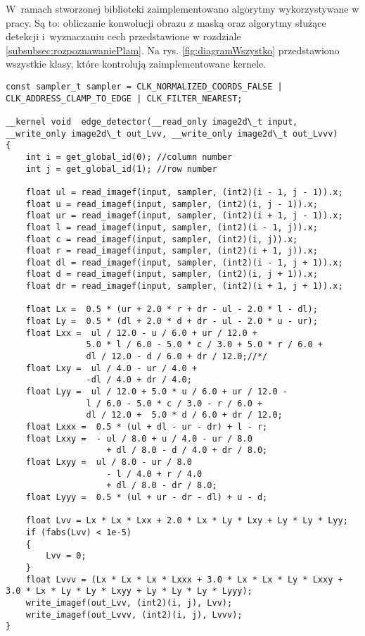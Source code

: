W~ramach stworzonej biblioteki zaimplementowano algorytmy wykorzystywane w pracy. Są to: obliczanie konwolucji obrazu z maską oraz algorytmy służące detekcji i~wyznaczaniu cech przedstawione w rozdziale \ref{subsubsec:rozpoznawaniePlam}. Na rys. \ref{fig:diagramWszystko} przedstawiono wszystkie klasy, które kontrolują zaimplementowane kernele.

\begin{lstlisting}
const sampler_t sampler = CLK_NORMALIZED_COORDS_FALSE | CLK_ADDRESS_CLAMP_TO_EDGE | CLK_FILTER_NEAREST;

__kernel void  edge_detector(__read_only image2d\_t input, __write_only image2d\_t out_Lvv, __write_only image2d\_t out_Lvvv)
{
	int i = get_global_id(0); //column number
	int j = get_global_id(1); //row number

	float ul = read_imagef(input, sampler, (int2)(i - 1, j - 1)).x;
	float u = read_imagef(input, sampler, (int2)(i, j - 1)).x;
	float ur = read_imagef(input, sampler, (int2)(i + 1, j - 1)).x;
	float l = read_imagef(input, sampler, (int2)(i - 1, j)).x;
	float c = read_imagef(input, sampler, (int2)(i, j)).x;
	float r = read_imagef(input, sampler, (int2)(i + 1, j)).x;
	float dl = read_imagef(input, sampler, (int2)(i - 1, j + 1)).x;
	float d = read_imagef(input, sampler, (int2)(i, j + 1)).x;
	float dr = read_imagef(input, sampler, (int2)(i + 1, j + 1)).x;

	float Lx =  0.5 * (ur + 2.0 * r + dr - ul - 2.0 * l - dl);
	float Ly =  0.5 * (dl + 2.0 * d + dr - ul - 2.0 * u - ur);
	float Lxx =  ul / 12.0 - u / 6.0 + ur / 12.0 +
                5.0 * l / 6.0 - 5.0 * c / 3.0 + 5.0 * r / 6.0 +
				dl / 12.0 - d / 6.0 + dr / 12.0;//*/
	float Lxy =  ul / 4.0 - ur / 4.0 +
				-dl / 4.0 + dr / 4.0;
	float Lyy =  ul / 12.0 + 5.0 * u / 6.0 + ur / 12.0 -
                l / 6.0 - 5.0 * c / 3.0 - r / 6.0 +
				dl / 12.0 +  5.0 * d / 6.0 + dr / 12.0;
	float Lxxx =  0.5 * (ul + dl - ur - dr) + l - r;
	float Lxxy =  - ul / 8.0 + u / 4.0 - ur / 8.0
					+ dl / 8.0 - d / 4.0 + dr / 8.0;
	float Lxyy =  ul / 8.0 - ur / 8.0
					- l / 4.0 + r / 4.0
					+ dl / 8.0 - dr / 8.0;
	float Lyyy =  0.5 * (ul + ur - dr - dl) + u - d;
	
	float Lvv = Lx * Lx * Lxx + 2.0 * Lx * Ly * Lxy + Ly * Ly * Lyy;
	if (fabs(Lvv) < 1e-5)
	{
		Lvv = 0;
	}
	float Lvvv = (Lx * Lx * Lx * Lxxx + 3.0 * Lx * Lx * Ly * Lxxy + 3.0 * Lx * Ly * Ly * Lxyy + Ly * Ly * Ly * Lyyy);
	write_imagef(out_Lvv, (int2)(i, j), Lvv);
	write_imagef(out_Lvvv, (int2)(i, j), Lvvv);
}
\end{lstlisting}

